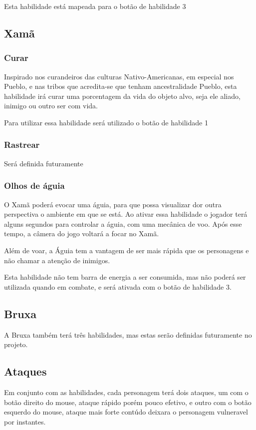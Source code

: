 Esta habilidade está mapeada para o botão de habilidade 3 



\subsection{Xamã}
\subsubsection{Curar}
Inspirado nos curandeiros das culturas Nativo-Americanas, em especial nos Pueblo, e nas tribos que acredita-se que tenham ancestralidade Pueblo, esta habilidade irá curar uma porcentagem da vida do objeto alvo, seja ele aliado, inimigo ou outro ser com vida.

Para utilizar essa habilidade será utilizado o botão de habilidade 1

\subsubsection{Rastrear}
Será definida futuramente

\subsubsection{Olhos de águia}

O Xamã poderá evocar uma águia, para que possa visualizar dor outra perspectiva o ambiente em que se está. Ao ativar essa habilidade o jogador terá alguns segundos para controlar a águia, com uma mecânica de voo. Após esse tempo, a câmera do jogo voltará a focar no Xamã.

Além de voar, a Águia tem a vantagem de ser mais rápida que os personagens e não chamar a atenção de inimigos.

Esta habilidade não tem barra de energia a ser consumida, mas não poderá ser utilizada quando em combate, e será ativada com o botão de habilidade 3. 


\subsection{Bruxa}

A Bruxa também terá três habilidades, mas estas serão definidas futuramente no projeto. 

\subsection{Ataques}
Em conjunto com as habilidades, cada personagem terá dois ataques, um com o botão direito do mouse, ataque rápido porém pouco efetivo, e outro com o botão esquerdo do mouse, ataque mais forte contúdo deixara o personagem vulneravel por instantes.


